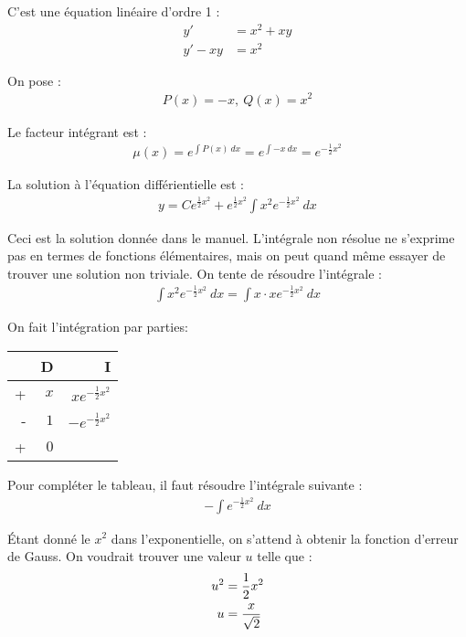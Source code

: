 C'est une équation linéaire d'ordre 1 :
\begin{align*}
    y' &= x^2+xy \\
    y' -xy &= x^2
\end{align*}

On pose :
\begin{align*}
    P(x) = -x,\ Q(x) = x^2
\end{align*}

Le facteur intégrant est :
\begin{align*}
    \mu(x) = e^{\int{P(x)\ dx}} = e^{\int{-x\ dx}} = e^{-\frac{1}{2}x^2}
\end{align*}

La solution à l'équation différientielle est :
\begin{align*}
    y = Ce^{\frac{1}{2}x^2} + e^{\frac{1}{2}x^2}\int{x^2 e^{-\frac{1}{2}x^2}\ dx}
\end{align*}

Ceci est la solution donnée dans le manuel. L'intégrale non résolue ne s'exprime
pas en termes de fonctions élémentaires, mais on peut quand même essayer de
trouver une solution non triviale. On tente de résoudre l'intégrale :
\begin{align*}
    \int{x^2 e^{-\frac{1}{2}x^2}\ dx} = \int{x\cdot xe^{-\frac{1}{2}x^2}\ dx}
\end{align*}

On fait l'intégration par parties:
\begin{table}[H]
    \centering
    \begin{tabular}{rrr}
	\toprule[1pt]
	 & D & I \\
	\midrule
	+ & $x$ & $xe^{-\frac{1}{2}x^2}$\vspace{1mm}\\
	- & $1$ & $-e^{-\frac{1}{2}x^2}$\vspace{2mm}\\
	+ & $0$ & \vspace{2mm}\\
	\bottomrule[1pt]
    \end{tabular}
\end{table}

Pour compléter le tableau, il faut résoudre l'intégrale suivante :
\begin{align*}
    -\int{e^{-\frac{1}{2}x^2}\ dx}
\end{align*}

Étant donné le $x^2$ dans l'exponentielle, on s'attend à obtenir la fonction
d'erreur de Gauss. On voudrait trouver une valeur $u$ telle que :
\begin{align*}
    u^2 &= \dfrac{1}{2}x^2 \\
    u &= \dfrac{x}{\sqrt{2}}
\end{align*}

